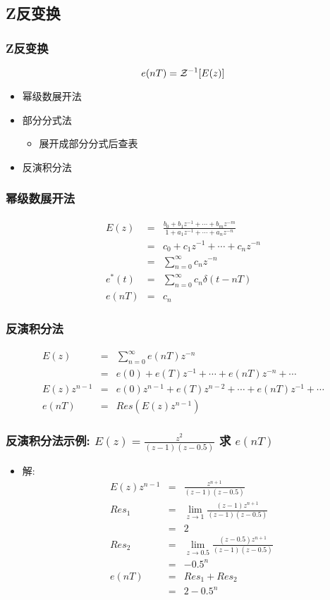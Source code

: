 \documentclass[table]{beamer}
\begin{document}
\subsection{Z反变换}
\label{sec-3-2}
\begin{frame}
\frametitle{Z反变换}
\label{sec-3-2-1}

  \[e(nT)={\cal Z}^{-1}[E(z)]\]
\begin{itemize}
\item 幂级数展开法
\item 部分分式法
\begin{itemize}
\item 展开成部分分式后查表
\end{itemize}
\item 反演积分法
\end{itemize}
\end{frame}
\begin{frame}
\frametitle{幂级数展开法}
\label{sec-3-2-2}

\begin{eqnarray*}
E(z) & = &\frac{b_0+b_1 z^{-1}+\cdots+b_m z^{-m}}{1+a_1 z^{-1}+\cdots+a_n z^{-n}} \\
 &=& c_0+c_1 z^{-1}+\cdots +c_n z^{-n} \\
 &=& \sum_{n=0}^{\infty}c_n z^{-n} \\
e^{*}(t) &=& \sum_{n=0}^{\infty}c_n\delta(t-nT) \\
e(nT) &=& c_n 
\end{eqnarray*}
\end{frame}
\begin{frame}
\frametitle{反演积分法}
\label{sec-3-2-3}

\begin{eqnarray*}
E(z) & = & \sum_{n=0}^{\infty}e(nT)z^{-n} \\
  &=& e(0)+e(T)z^{-1}+\cdots+e(nT)z^{-n}+\cdots \\
E(z)z^{n-1} &=& e(0)z^{n-1}+e(T)z^{n-2}+\cdots+e(nT)z^{-1}+\cdots \\
e(nT)&=& Res(E(z)z^{n-1})
\end{eqnarray*}
\end{frame}
\begin{frame}
\frametitle{反演积分法示例:  $E(z)=\frac{z^2}{(z-1)(z-0.5)}$  求  $e(nT)$}
\label{sec-3-2-4}

\begin{itemize}
\item <2->解:
      \begin{eqnarray*}
      E(z)z^{n-1} & = &\frac{z^{n+1}}{(z-1)(z-0.5)} \\
      Res_1 &=& \lim_{z\rightarrow 1}\frac{(z-1)z^{n+1}}{(z-1)(z-0.5)} \\
	 &=& 2 \\
      Res_2 &=& \lim_{z\rightarrow 0.5}\frac{(z-0.5)z^{n+1}}{(z-1)(z-0.5)} \\
	 &=& -0.5^n \\
      e(nT) &=& Res_1+Res_2 \\
       &=& 2-0.5^n
      \end{eqnarray*}
\end{itemize}
\end{frame}
\end{document}
